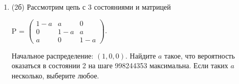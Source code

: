 \documentclass[a4paper, 14pt]{extarticle}
\begin{document}
\begin{enumerate}
\item (2б) Рассмотрим цепь с 3 состояниями и матрицей

\begin{center}
    P = $\left ( \begin{array}{ccc}
        1 - a & a & 0 \\
        0 & 1 - a & a \\
        a & 0 & 1 - a
    \end{array} \right ).$
\end{center}

Начальное распределение: $\left ( 1, 0, 0 \right )$. Найдите $a$ такое, что вероятность оказаться в состоянии 2 на шаге 998244353 максимальна. Если таких $a$ несколько, выберите любое.

\end{enumerate}
\end{document}
